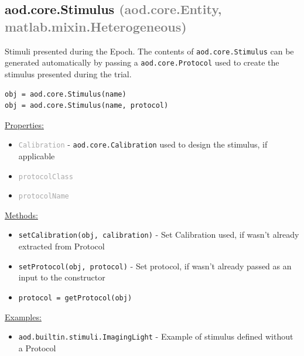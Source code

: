 \documentclass[10pt]{exam}
\newcommand\myparent[1]{\textcolor{gray}{(#1)}}
\newcommand\aodclass[1]{\textcolor{codeblue}{\texttt{#1}}}
\newcommand\aodprop[1]{\textcolor{darkgray}{\texttt{#1}}}
\newcommand\aodfcn[1]{\textcolor{darkteal}{\texttt{#1}}}
\newcommand\docheader[1]{\vspace{0.6ex}\noindent\underline{#1}\vspace{0.15ex}}
\begin{document}
	\subsection{aod.core.Stimulus \myparent{aod.core.Entity, matlab.mixin.Heterogeneous}}
		\noindent Stimuli presented during the Epoch. The contents of \aodclass{aod.core.Stimulus} can be generated automatically by passing a \aodclass{aod.core.Protocol} used to create the stimulus presented during the trial.
		\begin{lstlisting}
obj = aod.core.Stimulus(name)
obj = aod.core.Stimulus(name, protocol)
		\end{lstlisting}
		\docheader{Properties:}
		\begin{itemize}
			\item \aodprop{Calibration} - \aodclass{aod.core.Calibration} used to design the stimulus, if applicable
			\item \aodprop{protocolClass}
			\item \aodprop{protocolName}
		\end{itemize}
		\docheader{Methods:}
		\begin{itemize}
			\item \aodfcn{setCalibration(obj, calibration)} - Set Calibration used, if wasn't already extracted from Protocol
			\item \aodfcn{setProtocol(obj, protocol)} - Set protocol, if wasn't already passed as an input to the constructor
			\item \aodfcn{protocol = getProtocol(obj)}
		\end{itemize}
		\docheader{Examples:}
		\begin{itemize}
			\item \aodclass{aod.builtin.stimuli.ImagingLight} - Example of stimulus defined without a Protocol
		\end{itemize}
	
\end{document}
